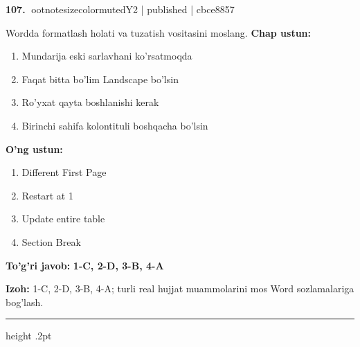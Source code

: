 \documentclass[10pt,a4paper]{article}
\begin{document}
\textbf{\color{ink}107.} {ootnotesizecolor{muted}Y2 | published | cbce8857}
\par
Wordda formatlash holati va tuzatish vositasini moslang.
\textbf{Chap ustun:}\begin{enumerate}[label=\arabic*),leftmargin=9mm]
\item Mundarija eski sarlavhani ko'rsatmoqda
\item Faqat bitta bo'lim Landscape bo'lsin
\item Ro'yxat qayta boshlanishi kerak
\item Birinchi sahifa kolontituli boshqacha bo'lsin
\end{enumerate}
\textbf{O'ng ustun:}\begin{enumerate}[label=\Alph*),leftmargin=9mm]
\item Different First Page
\item Restart at 1
\item Update entire table
\item Section Break
\end{enumerate}
\begin{tcolorbox}[enhanced,breakable,colback=teal!4,colframe=teal!55!black,boxrule=0.45pt,arc=1.2mm,left=2.8mm,right=2.8mm,top=2mm,bottom=2mm]
\textbf{\color{teal}To'g'ri javob:} \textbf{1-C, 2-D, 3-B, 4-A}
\par\smallskip
\textbf{Izoh:} 1-C, 2-D, 3-B, 4-A; turli real hujjat muammolarini mos Word sozlamalariga bog'lash.
\end{tcolorbox}
\vspace{2mm}\hrule height .2pt\vspace{2mm}
\end{document}
